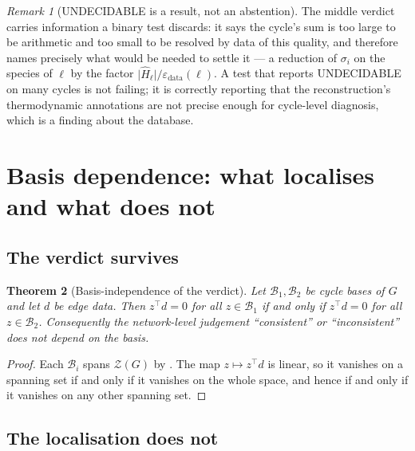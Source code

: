 \documentclass[11pt,twocolumn,a4paper]{article}
\theoremstyle{pstyle}
\newtheorem{theorem}{Theorem}[section]
\theoremstyle{definition}
\theoremstyle{remark}
\newtheorem{remark}[theorem]{Remark}
\newcommand{\abs}[1]{\lvert#1\rvert}
\newcommand{\eps}{\varepsilon}
\newcommand{\epsdata}{\eps_{\mathrm{data}}}
\newcommand{\hol}{H}
\begin{document}
\begin{remark}[\textsf{UNDECIDABLE} is a result, not an abstention]
\label{rem:undecidable}
The middle verdict carries information a binary test discards: it says
the cycle's sum is too large to be arithmetic and too small to be
resolved by data of this quality, and therefore names precisely what
would be needed to settle it --- a reduction of $\sigma_i$ on the
species of $\ell$ by the factor $\abs{\widehat{\hol}_\ell}/\epsdata(\ell)$.
A test that reports \textsf{UNDECIDABLE} on many cycles is not failing;
it is correctly reporting that the reconstruction's thermodynamic
annotations are not precise enough for cycle-level diagnosis, which is a
finding about the database.
\end{remark}

\section{Basis dependence: what localises and what does not}
\label{sec:basis}

\subsection{The verdict survives}

\begin{theorem}[Basis-independence of the verdict]
\label{thm:basis-verdict}
Let $\mathcal{B}_1,\mathcal{B}_2$ be cycle bases of $G$ and let $d$ be
edge data. Then $z^{\top}d = 0$ for all $z\in\mathcal{B}_1$ if and only
if $z^{\top}d=0$ for all $z\in\mathcal{B}_2$. Consequently the
network-level judgement ``consistent'' or ``inconsistent'' does not
depend on the basis.
\end{theorem}

\begin{proof}
Each $\mathcal{B}_i$ spans $\mathcal{Z}(G)$ by .
The map $z\mapsto z^{\top}d$ is linear, so it vanishes on a spanning set
if and only if it vanishes on the whole space, and hence if and only if
it vanishes on any other spanning set.
\end{proof}

\subsection{The localisation does not}
\end{document}
